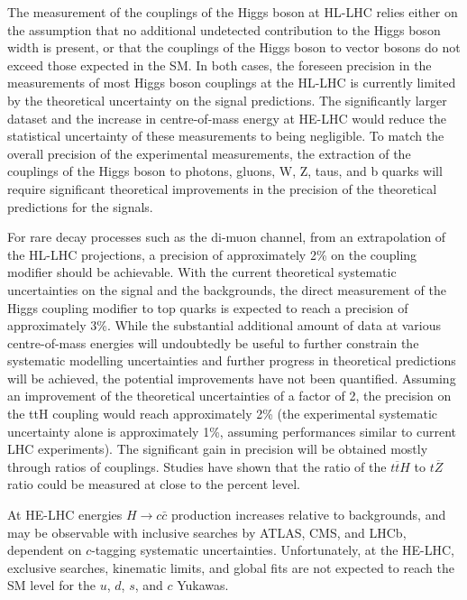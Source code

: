 \documentclass[../report.tex]{subfiles}
\begin{document}
The measurement of the couplings of the Higgs boson at HL-LHC relies either on the assumption that no additional undetected contribution to the Higgs boson width is present, or that the couplings of the Higgs boson to vector bosons do not exceed those expected in the SM. In both cases, the foreseen precision in the measurements of most Higgs boson couplings at the HL-LHC is currently limited by the theoretical uncertainty on the signal predictions. The significantly larger dataset and the increase in centre-of-mass energy at HE-LHC would reduce the statistical uncertainty of these measurements to being negligible.
To match the overall precision of the experimental measurements, the extraction of the couplings of the Higgs boson to photons, gluons, W, Z, taus, and b quarks will require significant theoretical improvements in the precision of the theoretical predictions for the signals.

For rare decay processes such as the di-muon channel, from an extrapolation of the HL-LHC projections, a precision of approximately 2\% on the coupling modifier 
should be achievable.
 With the current theoretical systematic uncertainties on the signal and the backgrounds, the direct measurement of the Higgs coupling modifier to top quarks is expected to reach a precision of approximately 3\%. While the substantial additional amount of data at various centre-of-mass energies will undoubtedly be useful to further constrain the systematic modelling uncertainties and further progress in theoretical predictions will be achieved, the potential improvements have not been quantified. Assuming an improvement of the theoretical uncertainties of a factor of 2, the precision on the ttH coupling would reach approximately 2\% (the experimental systematic uncertainty alone is approximately 1\%, assuming performances similar to current LHC experiments). The significant gain in precision will be obtained mostly through ratios of couplings. Studies have shown that the ratio of the $t\overline{t}H$ to $t\overline{Z}$ ratio could be measured at close to the percent level.

At HE-LHC energies $H \to c\bar{c}$ production increases relative to backgrounds, and may be observable with inclusive searches by ATLAS, CMS, and LHCb, dependent on $c$-tagging systematic uncertainties. Unfortunately, at the HE-LHC, exclusive searches, kinematic limits, and global fits are not expected to reach the SM level for the $u$, $d$, $s$, and $c$ Yukawas.
\end{document}
